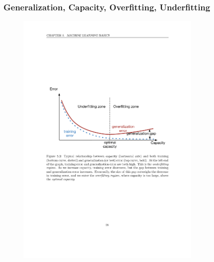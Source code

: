 \documentclass{beamer}
\begin{document}
%

\begin{frame}
  \frametitle{Generalization, Capacity, Overfitting, Underfitting}

  \begin{figure}
    \centering
    \includegraphics[width=0.8\textwidth]{relationships_between_terms.pdf}
  \end{figure}
\end{frame}
\end{document}
